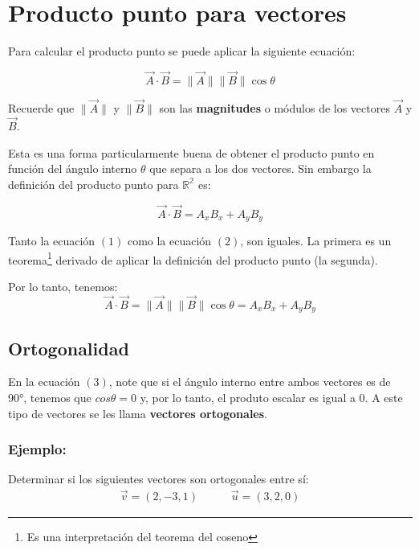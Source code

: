 \documentclass{article}
\begin{document}
\section{Producto punto para vectores}

    Para calcular el producto punto se puede aplicar la siguiente ecuación:

    \begin{equation}
        \vec{A} \cdot \vec{B} = \parallel\vec{A}\parallel \parallel\vec{B}\parallel \cos \theta
    \end{equation}

    Recuerde que $\parallel\vec{A}\parallel$ y $\parallel\vec{B}\parallel$ son las \textbf{magnitudes} o módulos de los vectores $\vec{A}$ y $\vec{B}$.

    Esta es una forma particularmente buena de obtener el producto punto en función del ángulo interno $\theta$ que separa a los dos vectores. Sin embargo la definición del producto punto para $\mathbb{R^2}$ es:

    \begin{equation}
        \vec{A} \cdot \vec{B} = A_xB_x + A_yB_y
    \end{equation}

    Tanto la ecuación $(1)$ como la ecuación $(2)$, son iguales. La primera es un teorema\footnote{Es una interpretación del teorema del coseno} derivado de aplicar la definición del producto punto (la segunda).

    Por lo tanto, tenemos: 
    \begin{equation}
        \vec{A} \cdot \vec{B} = \parallel\vec{A}\parallel \parallel\vec{B}\parallel \cos \theta = A_xB_x + A_yB_y
    \end{equation}
    
    \subsection{Ortogonalidad}
    
        En la ecuación $(3)$, note que si el ángulo interno entre ambos vectores es de 90°, tenemos que $cos \theta = 0$ y, por lo tanto, el produto escalar es igual a $0$. A este tipo de vectores se les llama \textbf{vectores ortogonales}.

        \subsubsection*{Ejemplo:}

            Determinar si los siguientes vectores son ortogonales entre sí:
            \begin{gather*}
                \vec{v}=(2,-3,1) \hspace{35pt} \vec{u}=(3,2,0)
            \end{gather*}
\end{document}
